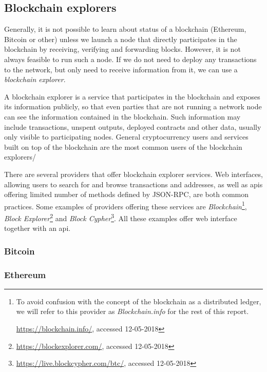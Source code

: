\subsection{Blockchain explorers}
Generally, it is not possible to learn about status of a blockchain (Ethereum, Bitcoin or other) unless we launch a node that directly participates in the blockchain by receiving, verifying and forwarding blocks. However, it is not always feasible to run such a node. If we do not need to deploy any transactions to the network, but only need to receive information from it, we can use a \textit{blockchain explorer}.

A blockchain explorer is a service that participates in the blockchain and exposes its information publicly, so that even parties that are not running a network node can see the information contained in the blockchain\footnotemark. Such information may include transactions, unspent outputs, deployed contracts and other data, usually only visible to participating nodes. 
% 
% 
General cryptocurrency users and services built on top of the blockchain are the most common users of the blockchain explorers\footnotemark/
%

There are several providers that offer blockchain explorer services. Web interfaces, allowing users to search for and browse transactions and addresses, as well as \acrshort{api}s offering limited number of methods defined by JSON-RPC, are both common practices. Some examples of providers offering these services are \textit{Blockchain}\footnote{To avoid confusion with the concept of the blockchain as a distributed ledger, we will refer to this provider as \textit{Blockchain.info} for the rest of this report.

\url{https://blockchain.info/}, accessed 12-05-2018}, \textit{Block Explorer}\footnote{\url{https://blockexplorer.com/}, accessed 12-05-2018} and \textit{Block Cypher}\footnote{\url{https://live.blockcypher.com/btc/}, accessed 12-05-2018}. All these examples offer web interface together with an \acrshort{api}.

\subsubsection{Bitcoin}

\subsubsection{Ethereum}